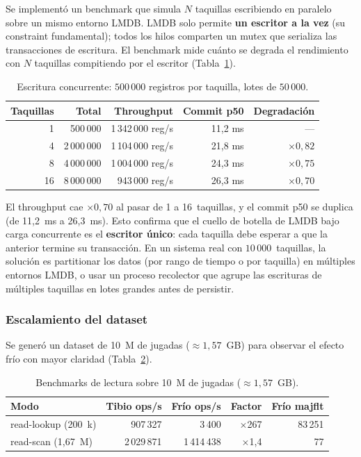 \documentclass[12pt, letterpaper]{article}
\begin{document}
Se implementó un benchmark que simula $N$ taquillas escribiendo en paralelo
sobre un mismo entorno LMDB. LMDB solo permite \textbf{un escritor a la
vez} (su constraint fundamental); todos los hilos comparten un mutex que
serializa las transacciones de escritura. El benchmark mide cuánto se
degrada el rendimiento con $N$ taquillas compitiendo por el escritor
(Tabla~\ref{tab:fase5_concurrente}).

\begin{table}[H]
\centering
\caption{Escritura concurrente: $500\,000$ registros por taquilla, lotes de $50\,000$.}
\label{tab:fase5_concurrente}
\begin{tabular}{@{}r r r r r@{}}
\toprule
\textbf{Taquillas} & \textbf{Total} & \textbf{Throughput} & \textbf{Commit p50} & \textbf{Degradación} \\
\midrule
1 & 500\,000 & 1\,342\,000 reg/s & 11,2 ms & --- \\
4 & 2\,000\,000 & 1\,104\,000 reg/s & 21,8 ms & $\times 0{,}82$ \\
8 & 4\,000\,000 & 1\,004\,000 reg/s & 24,3 ms & $\times 0{,}75$ \\
16 & 8\,000\,000 & 943\,000 reg/s & 26,3 ms & $\times 0{,}70$ \\
\bottomrule
\end{tabular}
\end{table}

El throughput cae $\times 0{,}70$ al pasar de 1 a 16~taquillas, y el commit
p50 se duplica (de 11,2~ms a 26,3~ms). Esto confirma que el cuello de
botella de LMDB bajo carga concurrente es el \textbf{escritor único}: cada
taquilla debe esperar a que la anterior termine su transacción. En un
sistema real con $10\,000$~taquillas, la solución es partitionar los datos
(por rango de tiempo o por taquilla) en múltiples entornos LMDB, o usar un
proceso recolector que agrupe las escrituras de múltiples taquillas en
lotes grandes antes de persistir.

\subsubsection{Escalamiento del dataset}

Se generó un dataset de 10~M de jugadas ($\approx 1{,}57$~GB) para observar
el efecto frío con mayor claridad (Tabla~\ref{tab:fase5_10m}).

\begin{table}[H]
\centering
\caption{Benchmarks de lectura sobre 10~M de jugadas ($\approx 1{,}57$~GB).}
\label{tab:fase5_10m}
\begin{tabular}{@{}l r r r r@{}}
\toprule
\textbf{Modo} & \textbf{Tibio ops/s} & \textbf{Frío ops/s} & \textbf{Factor} & \textbf{Frío majflt} \\
\midrule
read-lookup (200~k) & 907\,327 & 3\,400 & $\times$267 & 83\,251 \\
read-scan (1,67~M) & 2\,029\,871 & 1\,414\,438 & $\times$1,4 & 77 \\
\bottomrule
\end{tabular}
\end{table}
\end{document}
